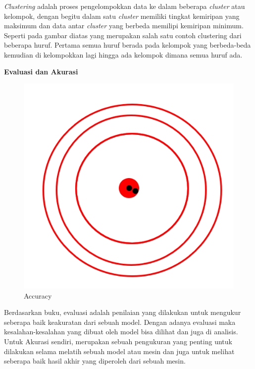 \documentclass{report}
\begin{document}
\hangindent=0.5cm \emph{Clustering} adalah proses pengelompokkan data ke dalam beberapa \emph{cluster} atau kelompok, dengan begitu dalam satu \emph{cluster} memiliki tingkat kemiripan yang maksimum dan data antar \emph{cluster} yang berbeda memilipi kemiripan minimum. Seperti pada gambar diatas yang merupakan salah satu contoh clustering dari beberapa huruf. Pertama semua huruf berada pada kelompok yang berbeda-beda kemudian di kelompokkan lagi hingga ada kelompok dimana semua huruf ada.

\vspace{0.5cm}

{\bf Evaluasi dan Akurasi}
\vspace{0.1cm}

\begin{figure}[hbtp]
\centering
\includegraphics[scale=0.3]{../figures/Accuracy and Evaluation.png}
\caption{Accuracy}
\end{figure}

\vspace{0.1cm}

\hangindent=0.5cm Berdasarkan buku, evaluasi adalah penilaian yang dilakukan untuk mengukur seberapa baik keakuratan dari sebuah model. Dengan adanya evaluasi maka kesalahan-kesalahan yang dibuat oleh model bisa dilihat dan juga di analisis. Untuk Akurasi sendiri, merupakan sebuah pengukuran yang penting untuk dilakukan selama melatih sebuah model atau mesin dan juga untuk melihat seberapa baik hasil akhir yang diperoleh dari sebuah mesin.
\end{document}
